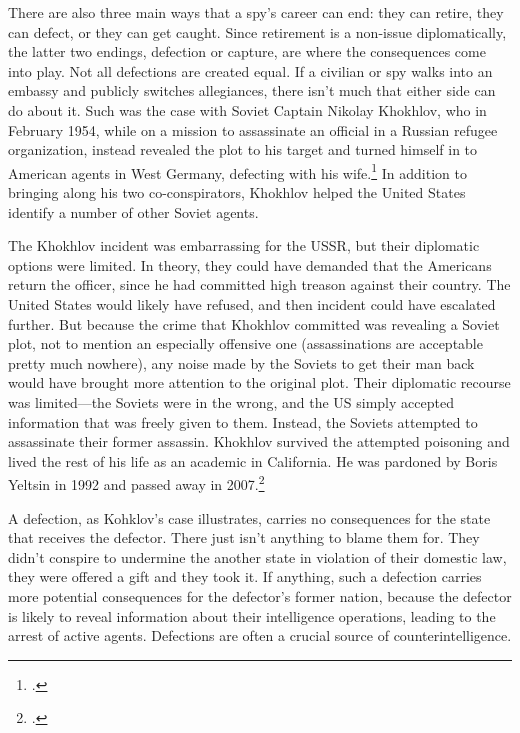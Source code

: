 \documentclass{memoir}
\begin{document}
\begin{refsegment}
There are also three main ways that a spy's career can end: they can retire, they can defect, or they can get caught. Since retirement is a non-issue diplomatically, the latter two endings, defection or capture, are where the consequences come into play. Not all defections are created equal. If a civilian or spy walks into an embassy and publicly switches allegiances, there isn't much that either side can do about it. Such was the case with Soviet Captain Nikolay Khokhlov, who in February 1954, while on a mission to assassinate an official in a Russian refugee organization, instead revealed the plot to his target and turned himself in to American agents in West Germany, defecting with his wife.\footcite[Captain Khoklov repeatedly emphasized at the press conference that his decision to defect was inspired by his wife Yanina, who told him that ``she would never permit their child to have an assasin as a father.'']{handler_another_1954} In addition to bringing along his two co-conspirators, Khokhlov helped the United States identify a number of other Soviet agents.

The Khokhlov incident was embarrassing for the USSR, but their diplomatic options were limited. In theory, they could have demanded that the Americans return the officer, since he had committed high treason against their country. The United States would likely have refused, and then incident could have escalated further. But because the crime that Khokhlov committed was revealing a Soviet plot, not to mention an especially offensive one (assassinations are acceptable pretty much nowhere), any noise made by the Soviets to get their man back would have brought more attention to the original plot. Their diplomatic recourse was limited---the Soviets were in the wrong, and the US simply accepted information that was freely given to them. Instead, the Soviets attempted to assassinate their former assassin. Khokhlov survived the attempted poisoning and lived the rest of his life as an academic in California. He was pardoned by Boris Yeltsin in 1992 and passed away in 2007.\footcite[p.~57]{mickolus_counterintelligence_2015}

A defection, as Kohklov's case illustrates, carries no consequences for the state that receives the defector. There just isn't anything to blame them for. They didn't conspire to undermine the another state in violation of their domestic law, they were offered a gift and they took it. If anything, such a defection carries more potential consequences for the defector's former nation, because the defector is likely to reveal information about their intelligence operations, leading to the arrest of active agents. Defections are often a crucial source of counterintelligence.


\end{refsegment}
\end{document}
